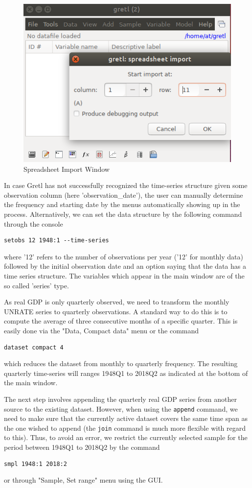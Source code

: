 \documentclass[11pt]{article}
\begin{document}
\begin{figure}[!h]
	\centering
	\includegraphics[width=.42\textwidth]{../figures/open_file}
	\caption{Spreadsheet Import Window}
	\label{fig:load}
\end{figure}

In case Gretl has not successfully recognized the time-series structure given some observation column (here 'observation\_date'), the user can manually determine the frequency and starting date by the menus automatically showing up in the process. Alternatively, we can set the data structure by the following command through the console
\begin{verbatim}
setobs 12 1948:1 --time-series
\end{verbatim}
where '12' refers to the number of observations per year ('12' for monthly data) followed by the initial observation date and an option saying that the data has a time series structure. The variables which appear in the main window are of the so called 'series' type.

As real GDP is only quarterly observed, we need to transform the monthly UNRATE series to quarterly observations. A standard way to do this is to compute the average of three consecutive months of a specific quarter. This is easily done via the "Data, Compact data" menu or the command
\begin{verbatim}
dataset compact 4
\end{verbatim}
which reduces the dataset from monthly to quarterly frequency. The resulting quarterly time-series will ranges 1948Q1 to 2018Q2 as indicated at the bottom of the main window.

The next step involves appending the quarterly real GDP series from another source to the existing dataset. However, when using the \texttt{append} command, we need to make sure that the currently active dataset covers the same time span as the one wished to append (the \texttt{join} command is much more flexible with regard to this). Thus, to avoid an error, we restrict the currently selected sample for the period between 1948Q1 to 2018Q2 by the command
\begin{verbatim}
smpl 1948:1 2018:2
\end{verbatim}
or through "Sample, Set range" menu using the GUI.
\end{document}
